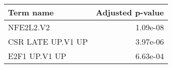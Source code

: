 \begin{tabular}{lr}
\toprule
        Term name &  Adjusted p-value \\
\midrule
        NFE2L2.V2 &          1.09e-08 \\
CSR LATE UP.V1 UP &          3.97e-06 \\
    E2F1 UP.V1 UP &          6.63e-04 \\
\bottomrule
\end{tabular}
